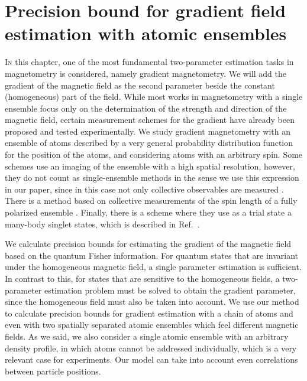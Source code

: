 \section[Metrology of the gradient magnetic field]
{Precision bound for gradient field estimation with atomic ensembles}

\label{sec:gm}


\lettrine[lines=2, findent=3pt, nindent=0pt]{I}{n} this chapter, one of the most fundamental two-parameter estimation tasks in magnetometry is considered, namely gradient magnetometry.
We will add the gradient of the magnetic field as the second parameter beside the constant (homogeneous) part of the field.
While most works in magnetometry with a single ensemble focus only on the determination of the strength and direction of the magnetic field, certain measurement schemes for the gradient have already been proposed and tested experimentally.
We study gradient magnetometry with an ensemble of atoms described by a very general probability distribution function for the position of the atoms, and considering atoms with an arbitrary spin.
Some schemes use an imaging of the ensemble with a high spatial resolution, however, they do not count as single-ensemble methods in the sense we use this expression in our paper, since in this case not only collective observables are measured  \cite{Vengalattore2007,Zhou2010,Koschorreck2011}.
There is a method based on collective measurements of the spin length of a fully polarized ensemble \cite{Behbood2013}.
Finally, there is a scheme where they use as a trial state a many-body singlet states, which is described in Ref.~\cite{Urizar-Lanz2013}.

We calculate precision bounds for estimating the gradient of the magnetic field based on the quantum Fisher information.
For quantum states that are invariant under the homogeneous magnetic field, a single parameter estimation is sufficient.
In contrast to this, for states that are sensitive to the homogeneous fields, a two-parameter estimation problem must be solved to obtain the gradient parameter, since the homogeneous field must also be taken into account.
We use our method to calculate precision bounds for gradient estimation with a chain of atoms and even with two spatially separated atomic ensembles which feel different magnetic fields.
As we said, we also consider a single atomic ensemble with an arbitrary density profile, in which atoms cannot be addressed individually, which is a very relevant case for experiments.
Our model can take into account even correlations between particle positions.

